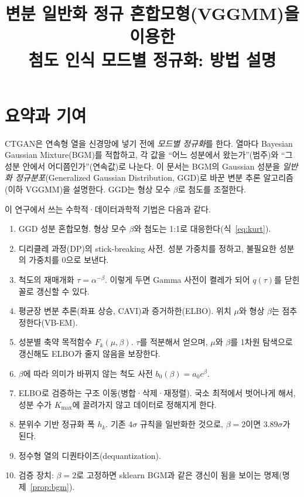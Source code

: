 \documentclass[11pt]{article}
\title{변분 일반화 정규 혼합모형(VGGMM)을 이용한\\ 첨도 인식 모드별 정규화: 방법 설명}
\author{}
\date{}
\begin{document}
\maketitle

\section{요약과 기여}

CTGAN은 연속형 열을 신경망에 넣기 전에 \emph{모드별 정규화}를 한다. 열마다 Bayesian Gaussian Mixture(BGM)를 적합하고, 각 값을 ``어느 성분에서 왔는가''(범주)와 ``그 성분 안에서 어디쯤인가''(연속값)로 나눈다.
이 문서는 BGM의 Gaussian 성분을 \emph{일반화 정규분포}(Generalized Gaussian Distribution, GGD)로 바꾼 변분 추론 알고리즘(이하 VGGMM)을 설명한다. GGD는 형상 모수 $\beta$로 첨도를 조절한다.

이 연구에서 쓰는 수학적·데이터과학적 기법은 다음과 같다.
\begin{enumerate}
  \item GGD 성분 혼합모형. 형상 모수 $\beta$와 첨도는 1:1로 대응한다(식~\eqref{eq:kurt}).
  \item 디리클레 과정(DP)의 stick-breaking 사전. 성분 가중치를 정하고, 불필요한 성분의 가중치를 0으로 보낸다.
  \item 척도의 재매개화 $\tau=\alpha^{-\beta}$. 이렇게 두면 Gamma 사전이 켤레가 되어 $q(\tau)$를 닫힌꼴로 갱신할 수 있다.
  \item 평균장 변분 추론(좌표 상승, CAVI)과 증거하한(ELBO). 위치 $\mu$와 형상 $\beta$는 점추정한다(VB-EM).
  \item 성분별 축약 목적함수 $F_k(\mu,\beta)$. $\tau$를 적분해서 얻으며, $\mu$와 $\beta$를 1차원 탐색으로 갱신해도 ELBO가 줄지 않음을 보장한다.
  \item $\beta$에 따라 의미가 바뀌지 않는 척도 사전 $b_0(\beta)=a_0c^{\beta}$.
  \item ELBO로 검증하는 구조 이동(병합·삭제·재정렬). 국소 최적에서 벗어나게 해서, 성분 수가 $K_{\max}$에 끌려가지 않고 데이터로 정해지게 한다.
  \item 분위수 기반 정규화 폭 $h_k$. 기존 $4\sigma$ 규칙을 일반화한 것으로, $\beta=2$이면 $3.89\sigma$가 된다.
  \item 정수형 열의 디퀀타이즈(dequantization).
  \item 검증 장치: $\beta=2$로 고정하면 sklearn BGM과 같은 갱신이 됨을 보이는 명제(명제~\ref{prop:bgm}).
\end{enumerate}
\end{document}
